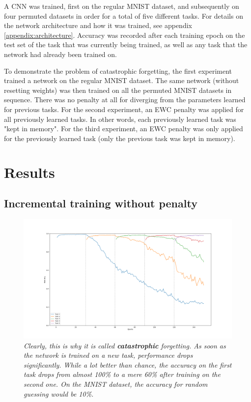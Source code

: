 \documentclass{article}
\begin{document}
        A CNN was trained, first on the regular 
        MNIST dataset, and subsequently on four permuted datasets in order for a 
        total of five different tasks. For details on the network architecture 
        and how it was trained, see appendix \ref{appendix:architecture}.
        Accuracy was recorded after each training epoch on the test set of 
        the task that was currently being trained, as well as any task that 
        the network had already been trained on.
        
        To demonstrate the problem of catastrophic forgetting, the first 
        experiment trained a network on the regular MNIST dataset. The same 
        network (without resetting weights) was then trained on all the 
        permuted MNIST datasets in sequence. There was no penalty at all for 
        diverging from the parameters learned for previous tasks. 
        For the second experiment, an EWC penalty was applied for
        all previously learned tasks. In other words, each previously learned 
        task was "kept in memory". For the third experiment, an EWC penalty was
        only applied for the previously learned task (only the previous task was 
        kept in memory).

    \section*{Results}
        \subsection*{Incremental training without penalty}
            \begin{figure}[H]
                \includegraphics[width=\textwidth]{figures/exp0_results.png}
                \caption{\textit{Clearly, this is why it is called
                \textbf{catastrophic} forgetting. As soon as the network 
                is trained on a new task, performance drops significantly. 
                While a lot better than chance, the accuracy on the first 
                task drops from almost 100\% to a mere 60\% after training 
                on the second one. On the MNIST dataset, the accuracy for 
                random guessing would be 10\%.}}
            \end{figure}
\end{document}
